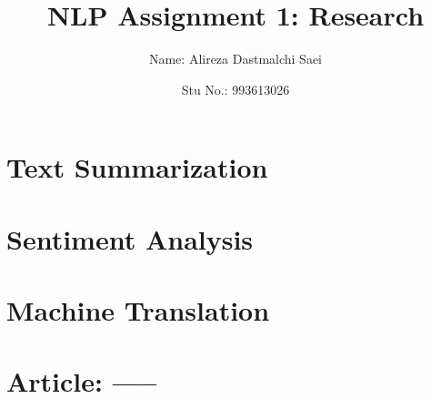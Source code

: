 \documentclass{article}
\title{\textbf{\Huge NLP Assignment 1: Research}}
\author{Name: Alireza Dastmalchi Saei}
\date{Stu No.: 993613026}
\begin{document}
\maketitle

\pagebreak

\section{Text Summarization}

\pagebreak

\section{Sentiment Analysis}

\pagebreak

\section{Machine Translation}

\pagebreak

\section{Article: -----}
\end{document}
